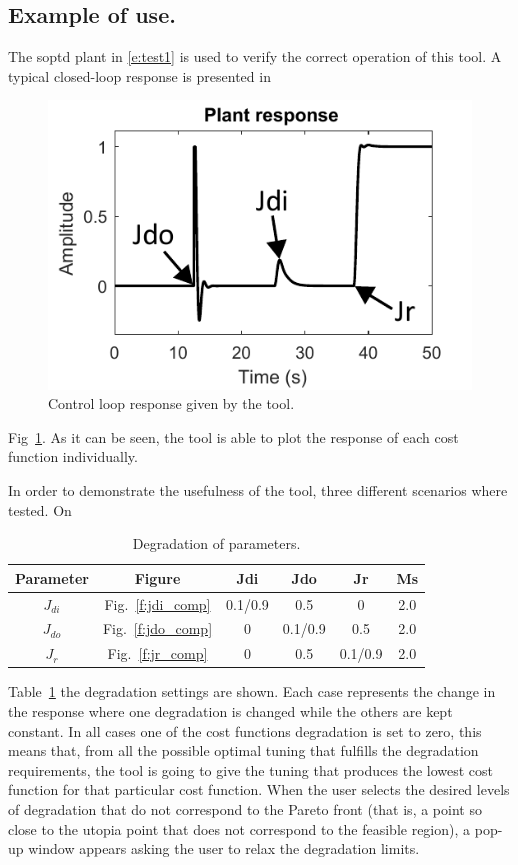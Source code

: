 \subsection{Example of use.}
\label{sec:example}
%
The \gls{soptd} plant in \eqref{e:test1} is used to verify the correct operation of this tool. A typical closed-loop response is presented in %
\begin{figure}
	\centering
	\includegraphics[width=0.65\columnwidth]{figuras/tuning}
	\caption{Control loop response given by the tool.}
	\label{f:control_loop_response}
\end{figure}
Fig~\ref{f:control_loop_response}. As it can be seen, the tool is able to plot the response of each cost function individually.

In order to demonstrate the usefulness of the tool, three different scenarios where tested. On %
%
\begin{table}
	\centering
	\caption{Degradation of parameters.}
	\label{t:jdi_jdo_jr_deg}
	\begin{tabular}{cccccc}
		\toprule
		\multicolumn{1}{c}{\textbf{Parameter}} & \textbf{Figure} & \textbf{Jdi} & \textbf{Jdo} & \textbf{Jr} & \textbf{Ms} \\
		\midrule
		$J_{di}$                      & Fig.~\ref{f:jdi_comp}  & 0.1/0.9      & 0.5          & 0           & 2.0         \\
		$J_{do}$                     &    Fig.~\ref{f:jdo_comp}& 0            & 0.1/0.9      & 0.5         & 2.0         \\
		$J_r$                      &   Fig.~\ref{f:jr_comp} & 0            & 0.5          & 0.1/0.9     & 2.0         \\
		\bottomrule
	\end{tabular}
\end{table}
%
Table~\ref{t:jdi_jdo_jr_deg} the degradation settings are shown. Each case represents the change in the response where one degradation is changed while the others are kept constant. In all cases one of the cost functions degradation is set to zero, this means that, from all the possible optimal tuning that fulfills the degradation requirements, the tool is going to give the tuning that produces the lowest cost function for that particular cost function. When the user selects the desired levels of degradation that do not correspond to the Pareto front (that is, a point so close to the utopia point that does not correspond to the feasible region), a pop-up window appears asking the user to relax the degradation limits.

